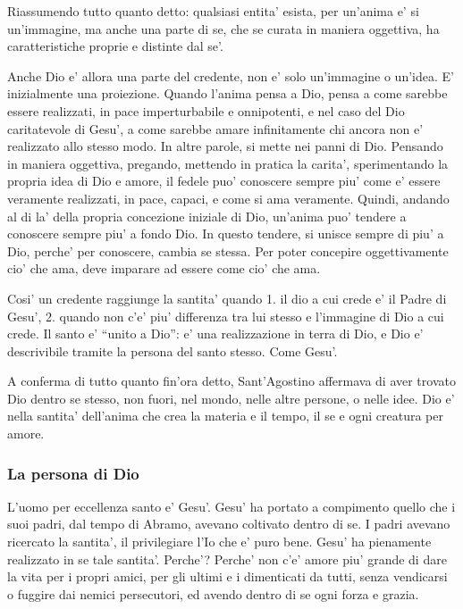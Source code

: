 Riassumendo tutto quanto detto: qualsiasi entita' esista, per un'anima e' si un'immagine, ma anche una parte di se, che se curata in maniera oggettiva, ha caratteristiche proprie e distinte dal se'.

Anche Dio e' allora una parte del credente, non e' solo un'immagine o un'idea. E' inizialmente una proiezione.
Quando l'anima pensa a Dio, pensa a come sarebbe essere realizzati, in pace imperturbabile e onnipotenti, e nel caso del Dio caritatevole di Gesu', a come sarebbe amare infinitamente chi ancora non e' realizzato allo stesso modo. In altre parole, si mette nei panni di Dio. Pensando in maniera oggettiva, pregando, mettendo in pratica la carita', sperimentando la propria idea di Dio e amore, il fedele puo' conoscere sempre piu' come e' essere veramente realizzati, in pace, capaci, e come si ama veramente. Quindi, andando al di la' della propria concezione iniziale di Dio, un'anima puo' tendere a conoscere sempre piu' a fondo Dio. In questo tendere, si unisce sempre di piu' a Dio, perche' per conoscere, cambia se stessa. Per poter concepire oggettivamente cio' che ama, deve imparare ad essere come cio' che ama.

Cosi' un credente raggiunge la santita' quando 1. il dio a cui crede e' il Padre di Gesu', 2. quando non c'e' piu' differenza tra lui stesso e l'immagine di Dio a cui crede. Il santo e' ``unito a Dio'': e' una realizzazione in terra di Dio, e Dio e' descrivibile tramite la persona del santo stesso. Come Gesu'. 


A conferma di tutto quanto fin'ora detto, Sant'Agostino affermava di aver trovato Dio dentro se stesso, non fuori, nel mondo, nelle altre persone, o nelle idee. Dio e' nella santita' dell'anima che crea la materia e il tempo, il se e ogni creatura per amore.

\subsubsection{La persona di Dio}

L'uomo per eccellenza santo e' Gesu'. Gesu' ha portato a compimento quello che i suoi padri, dal tempo di Abramo, avevano coltivato dentro di se. I padri avevano ricercato la santita', il privilegiare l'Io che e' puro bene. Gesu' ha pienamente realizzato in se tale santita'. Perche'? Perche' non c'e' amore piu' grande di dare la vita per i propri amici, per gli ultimi e i dimenticati da tutti, senza vendicarsi o fuggire dai nemici persecutori, ed avendo dentro di se ogni forza e grazia.

